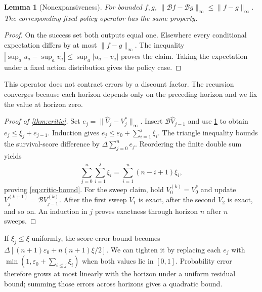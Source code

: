\documentclass{article}
\newtheorem{lemma}[theorem]{Lemma}
\theoremstyle{definition}
\theoremstyle{remark}
\begin{document}
\begin{lemma}[Nonexpansiveness]
\label{lem:nonexpansive}
For bounded $f,g$,
$\|\mathcal Bf-\mathcal Bg\|_\infty\le\|f-g\|_\infty$.
The corresponding fixed-policy operator has the same property.
\end{lemma}
\begin{proof}
On the success set both outputs equal one. Elsewhere every conditional expectation
differs by at most $\|f-g\|_\infty$. The inequality
$|\sup_a u_a-\sup_a v_a|\le\sup_a|u_a-v_a|$ proves the claim.
Taking the expectation under a fixed action distribution gives the policy case.
\end{proof}
This operator does not contract errors by a discount factor. The recursion converges
because each horizon depends only on the preceding horizon and we fix the value at horizon zero.

\begin{proof}[Proof of \cref{thm:critic}]
Set $e_j=\|\hat V_j-V_j^*\|_\infty$. Insert $\mathcal B\hat V_{j-1}$ and use
\cref{lem:nonexpansive} to obtain
$e_j\le\xi_j+e_{j-1}$. Induction gives
$e_j\le\varepsilon_0+\sum_{i=1}^j\xi_i$.
The triangle inequality bounds the survival-score difference by $\Delta\sum_{j=0}^{n}e_j$.
Reordering the finite double sum yields
\[
 \sum_{j=0}^{n}\sum_{i=1}^{j}\xi_i
   =\sum_{i=1}^{n}(n-i+1)\xi_i ,
\]
proving \cref{eq:critic-bound}.
For the sweep claim, hold $V_0^{(k)}=V_0^*$ and update
$V_j^{(k+1)}=\mathcal BV_{j-1}^{(k)}$.
After the first sweep $V_1$ is exact, after the second $V_2$ is exact, and so on.
An induction in $j$ proves exactness through horizon $n$ after $n$ sweeps.
\end{proof}
If $\xi_j\le\xi$ uniformly, the score-error bound becomes
$\Delta[(n+1)\varepsilon_0+n(n+1)\xi/2]$.
We can tighten it by replacing each $e_j$ with
$\min(1,\varepsilon_0+\sum_{i\le j}\xi_i)$ when both values lie in $[0,1]$.
Probability error therefore grows at most linearly with the horizon under a uniform
residual bound; summing those errors across horizons gives a quadratic bound.
\end{document}

